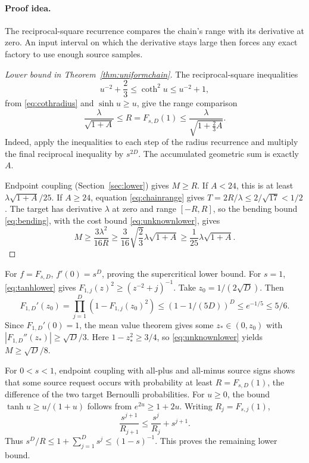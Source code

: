 \paragraph{Proof idea.}
The reciprocal-square recurrence compares the chain's range with its
derivative at zero. An input interval on which the derivative stays large
then forces any exact factory to use enough source samples.

\begin{proof}[Lower bound in Theorem~\ref{thm:uniformchain}]
The reciprocal-square inequalities
\[
u^{-2}+\frac23\le\coth^2u\le u^{-2}+1,
\]
from \eqref{eq:cothradius} and \(\sinh u\ge u\), give the range
comparison
\begin{equation}\label{eq:chainrange}
\frac{\lambda}{\sqrt{1+A}}\le R=F_{s,D}(1)
\le\frac{\lambda}{\sqrt{1+\frac23A}}.
\end{equation}
Indeed, apply the inequalities to each step of the radius recurrence
and multiply the final reciprocal inequality by \(s^{2D}\).
The accumulated geometric sum is exactly \(A\).

Endpoint coupling (Section~\ref{sec:lower}) gives \(M\ge R\).
If \(A<24\), this is at least
\(\lambda\sqrt{1+A}/25\).
If \(A\ge24\), equation \eqref{eq:chainrange} gives
\(T=2R/\lambda\le2/\sqrt{17}<1/2\). The target has derivative
\(\lambda\) at zero and range \([-R,R]\), so the bending
bound \eqref{eq:bending}, with the cost bound
\eqref{eq:unknownlower}, gives
\[
M\ge\frac{3\lambda^2}{16R}
\ge\frac3{16}\sqrt{\frac23}\lambda\sqrt{1+A}
\ge\frac1{25}\lambda\sqrt{1+A}.
\]
\end{proof}

For \(f=F_{s,D}\), \(f'(0)=s^D\), proving the supercritical lower
bound. For \(s=1\), \eqref{eq:tanhlower} gives
\(F_{1,j}(z)^2\ge(z^{-2}+j)^{-1}\).
Take \(z_0=1/(2\sqrt D)\). Then
\[
F_{1,D}'(z_0)
=\prod_{j=1}^D(1-F_{1,j}(z_0)^2)
\le(1-1/(5D))^D\le e^{-1/5}\le5/6.
\]
Since \(F_{1,D}'(0)=1\), the mean value theorem gives some
\(z_*\in(0,z_0)\) with
\(|F_{1,D}''(z_*)|\ge\sqrt D/3\).
Here \(1-z_*^2\ge3/4\), so \eqref{eq:unknownlower} yields
\(M\ge\sqrt D/8\).

For \(0<s<1\), endpoint coupling with all-plus and all-minus
source signs shows that some source request occurs with probability
at least \(R=F_{s,D}(1)\), the difference of the two target
Bernoulli probabilities. For \(u\ge0\), the bound
\(\tanh u\ge u/(1+u)\) follows from \(e^{2u}\ge1+2u\).
Writing \(R_j=F_{s,j}(1)\),
\[
\frac{s^{j+1}}{R_{j+1}}
\le\frac{s^j}{R_j}+s^{j+1}.
\]
Thus \(s^D/R\le1+\sum_{j=1}^D s^j\le(1-s)^{-1}\).
This proves the remaining lower bound.

